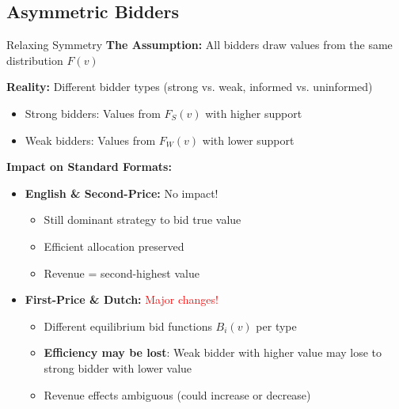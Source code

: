 \documentclass[xcolor={x11names}]{beamer}
\begin{document}
\subsection{Asymmetric Bidders}
\begin{frame}{Relaxing Symmetry}
\textbf{The Assumption:} All bidders draw values from the same distribution $F(v)$


\textbf{Reality:} Different bidder types (strong vs. weak, informed vs. uninformed)
\begin{itemize}
  \item Strong bidders: Values from $F_S(v)$ with higher support
  \item Weak bidders: Values from $F_W(v)$ with lower support
\end{itemize}


\textbf{Impact on Standard Formats:}
\begin{itemize}
  \item \textbf{English \& Second-Price:} \textcolor{green!70!black}{No impact!}
  \begin{itemize}
    \item Still dominant strategy to bid true value
    \item Efficient allocation preserved
    \item Revenue = second-highest value
  \end{itemize}
  
  \item \textbf{First-Price \& Dutch:} \textcolor{red}{Major changes!}
  \begin{itemize}
    \item Different equilibrium bid functions $B_i(v)$ per type
    \item \textbf{Efficiency may be lost}: Weak bidder with higher value may lose to strong bidder with lower value
    \item Revenue effects ambiguous (could increase or decrease)
  \end{itemize}
\end{itemize}
\end{frame}
\end{document}
